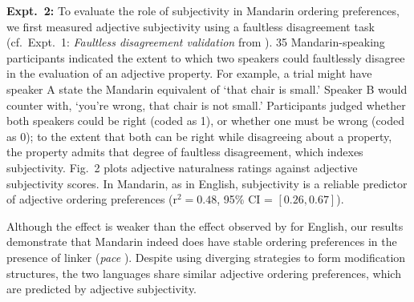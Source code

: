 \documentclass[10pt]{article}
\begin{document}
\textbf{Expt.~2:} To evaluate the role of subjectivity in Mandarin ordering preferences, we first measured adjective subjectivity using a faultless disagreement task (cf.~Expt.~1: \emph{Faultless disagreement validation} from \citeauthor{scontrasetal2017adjectives}). 35 Mandarin-speaking participants indicated the extent to which two speakers could faultlessly disagree in the evaluation of an adjective property. For example, a trial might have speaker A state the Mandarin equivalent of `that chair is small.' Speaker B would counter with, `you're wrong, that chair is not small.' Participants judged whether both speakers could be right (coded as 1), or whether one must be wrong (coded as 0); to the extent that both can be right while disagreeing about a property, the property admits that degree of faultless disagreement, which indexes subjectivity. Fig.~2 plots adjective naturalness ratings against adjective subjectivity scores. In Mandarin, as in English, subjectivity is a reliable predictor of adjective ordering preferences (r$^2 = 0.48$, 95\% CI = $[0.26,0.67]$). 

Although the effect is weaker than the effect observed by \citeauthor{scontrasetal2017adjectives} for English, our results demonstrate that Mandarin indeed does have stable ordering preferences in the presence of linker (\emph{pace} \citealp{sproatshih1991}). Despite using diverging strategies to form modification structures, the two languages share similar adjective ordering preferences, which are predicted by adjective subjectivity.\\

\vfill
\end{document}

